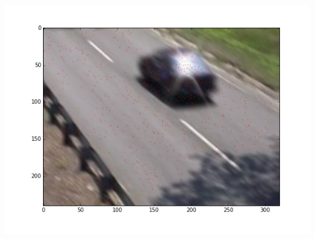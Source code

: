 \documentclass[12pt, a4paper]{article}
\begin{document}
		\begin{center}
			\includegraphics[width=15cm]{4par_vid.png}
		\end{center}
		
\end{document}
